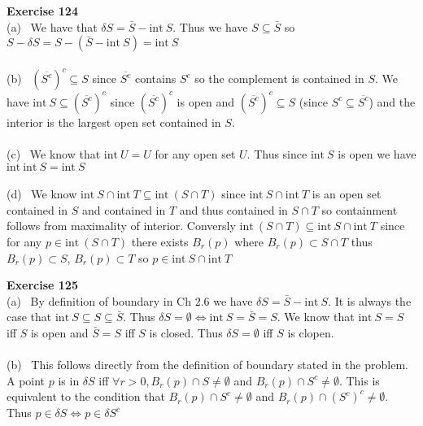 \documentclass[12pt]{article}
\newenvironment{ques}[1]{\textbf{Exercise #1}\vspace{1 mm}\\ }{\bigskip}
\theoremstyle{definition}
\renewcommand{\i}{\text{int} \ }
\begin{document}
\begin{ques}{124}
	(a) \ We have that $\delta S = \bar S - \i S$. Thus we have $S \subseteq
	\bar S$ so $S - \delta S = S - (\bar S - \i S) = \i S$\\
	\\
	(b) \  $(\overline {S^c})^c \subseteq S$ since $\overline {S^c}$ contains
	$S^c$ so the complement is contained in $S$. We have $\i S \subseteq
	(\overline {S^c})^c$ since $(\overline {S^c})^c$ is open and $(\overline
	{S^c})^c \subseteq S$ (since $S^c \subseteq \overline{S^c}$) and the
	interior is the largest open set contained in $S$.  \\
	\\
	(c) \ We know that $\i U = U$ for any open set $U$. Thus since $\i S$ is
	open we have $\i \i S = \i S$\\
	\\
	(d) \ We know $ \i S \cap \i T \subseteq \i (S \cap T) $ since $ \i S \cap
	\i T$ is an open set contained in $S$ and contained in $T$ and thus
	contained in $S \cap T$ so containment follows from maximality of interior.
	Conversly $\i (S \cap T) \subseteq \i S \cap \i T$ since for any $p \in \i
	(S \cap T)$ there exists $B_r(p)$ where $B_r(p) \subset S \cap T$ thus
	$B_r(p) \subset S$, $B_r(p) \subset T$ so $p \in \i S \cap \i T$
\end{ques}

\begin{ques}{125}
	(a) \ By definition of boundary in Ch 2.6 we have $\delta S = \bar S - \i
	S$. It is always the case that $\i S \subseteq S \subseteq \bar S$. Thus
	$\delta S = \emptyset \Leftrightarrow \i S = \bar S = S$. We know that $\i
	S = S$ iff $S$ is open and $\bar S = S$ iff $S$ is closed. Thus $\delta S =
	\emptyset$ iff $S$ is clopen.\\
	\\
	(b) \ This follows directly from the definition of boundary stated in the
	problem. A point $p$ is in $\delta S$ iff $\forall r > 0, B_r(p) \cap S
	\neq \emptyset$ and $B_r(p) \cap S^c \neq \emptyset$. This is equivalent to
	the condition that $B_r(p) \cap S^c \neq \emptyset$ and $B_r(p) \cap
	(S^c)^c \neq \emptyset$. Thus $p \in \delta S \Leftrightarrow p \in \delta
	S^c$
	 
\end{ques}
\end{document}
